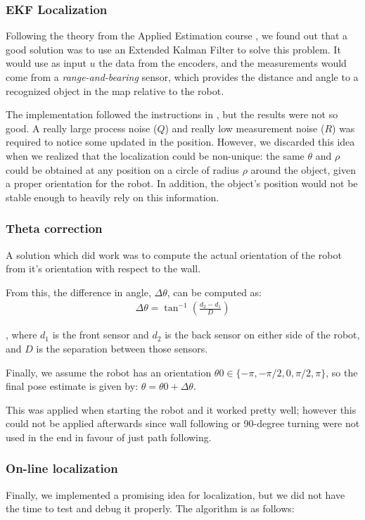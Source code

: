 \subsubsection{EKF Localization}
Following the theory from the Applied Estimation course \cite{Applied}, we found out that a good solution was to use an Extended Kalman Filter \cite{Thrun} to solve this problem. It would use as input $u$ the data from the encoders, and the measurements would come from a \emph{range-and-bearing} sensor, which provides the distance and angle to a recognized object in the map relative to the robot.

The implementation followed the instructions in \cite{Applied}, but the results were not so good. A really large process noise ($Q$) and really low measurement noise ($R$) was required to notice some updated in the position. However, we discarded this idea when we realized that the localization could be non-unique: the same $\theta$ and $\rho$ could be obtained at any position on a circle of radius $\rho$ around the object, given a proper orientation for the robot. In addition, the object's position would not be stable enough to heavily rely on this information. 

\subsubsection{Theta correction}
A solution which did work was to compute the actual orientation of the robot from it's orientation with respect to the wall. 

From this, the difference in angle, $\Delta\theta$, can be computed as:
\begin{align}
\label{eq:locTheta}
\Delta\theta = \tan^{-1}\left(\frac{d_2 - d_1}{D}\right)
\end{align}

, where $d_1$ is the front sensor and $d_2$ is the back sensor on either side of the robot, and $D$ is the separation between those sensors. 

Finally, we assume the robot has an orientation $\theta0 \in \{-\pi, -\pi/2, 0, \pi/2, \pi\}$, so the final pose estimate is given by: $\theta = \theta0 + \Delta\theta$.

This was applied when starting the robot and it worked pretty well; however this could not be applied afterwards since wall following or 90-degree turning were not used in the end in favour of just path following.  

\subsubsection{On-line localization}
Finally, we implemented a promising idea for localization, but we did not have the time to test and debug it properly. The algorithm is as follows:

